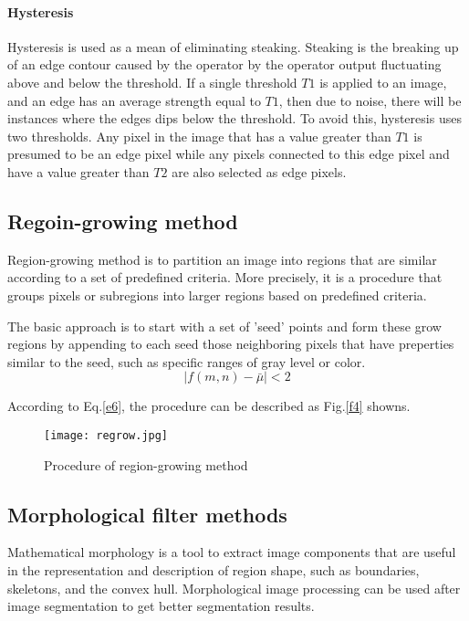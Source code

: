 \documentclass[journal]{IEEEtran}
\begin{document}
\paragraph{Hysteresis}
Hysteresis is used as a mean of eliminating steaking. Steaking is the breaking up of an edge contour caused by the operator by the operator output fluctuating above and below the threshold. If a single threshold $ T1 $ is applied to an image, and an edge has an average strength equal to $ T1$, then due to noise, there will be instances where the edges dips below the threshold. To avoid this, hysteresis uses two thresholds. Any pixel in the image that has a value greater than $ T1 $ is presumed to be an edge pixel while any pixels connected to this edge pixel and have a value greater than $ T2 $ are also selected as edge pixels.

\subsection{Regoin-growing method}
Region-growing method is to partition an image into regions that are similar according to a set of predefined criteria. More precisely, it is a procedure that groups pixels or subregions into larger regions based on predefined criteria.

The basic approach is to start with a set of 'seed' points and form these grow regions by appending to each seed those neighboring pixels that have preperties similar to the seed, such as specific ranges of gray level or color.
\begin{equation}\label{e6}
\left | f(m,n)-\bar{\mu}\right|<2 
\end{equation}

According to Eq.\ref{e6}, the procedure can be described as Fig.\ref{f4} showns.
\begin{figure}[h]
\centering
\texttt{[image: regrow.jpg]}
\caption{Procedure of region-growing method}
\label{f2}
\end{figure}

\subsection{Morphological filter methods}
Mathematical morphology is a tool to extract image components that are useful in the representation and description of region shape, such as boundaries, skeletons, and the convex hull. Morphological image processing can be used after image segmentation to get better segmentation results.
\end{document}
